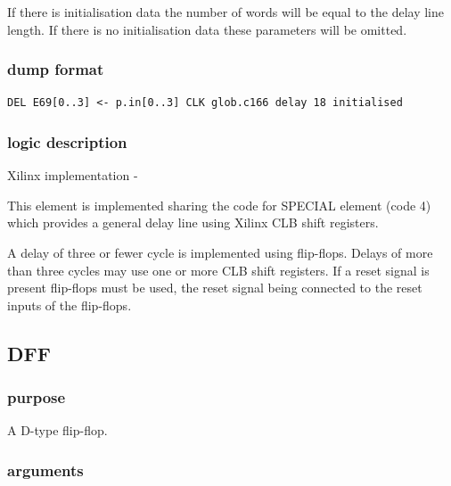 \documentclass[10pt,a4paper,twoside,fleqn]{book}
\begin{document}
                If there is initialisation data the number of words will
                be equal to the delay line length.
                If there is no initialisation data these parameters will
                be omitted.

                \subsubsection{dump format}

                    \begin{lstlisting}[gobble=20, language=tde]
                        DEL E69[0..3] <- p.in[0..3] CLK glob.c166 delay 18 initialised
                    \end{lstlisting}

                \subsubsection{logic description}

                    Xilinx implementation -

                    This element is implemented sharing the code for
                    SPECIAL element (code 4) which provides a general delay
                    line using Xilinx CLB shift registers.

                    A delay of three or fewer cycle is implemented using
                    flip-flops. Delays of more than three cycles may use one or
                    more CLB shift registers. If a reset signal is present
                    flip-flops must be used, the reset signal being connected to
                    the reset inputs of the flip-flops.


            \subsection{DFF}

                \subsubsection{purpose}

                    A D-type flip-flop.

                \subsubsection{arguments}
\end{document}
